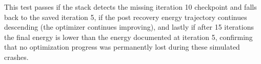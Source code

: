 This test passes if the stack detects the missing iteration 10 checkpoint and falls back to the saved iteration 5, if 
the post recovery energy trajectory continues descending (the optimizer continues improving), and lastly if  after 15 iterations the final energy
is lower than the energy documented at iteration 5, confirming that no optimization progress was permanently lost during these simulated crashes.